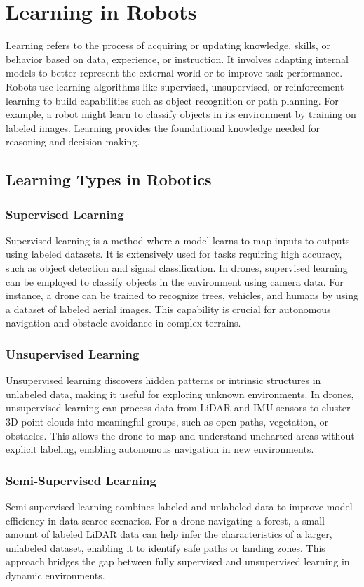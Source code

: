 \chapter{Learning in Robots}
Learning refers to the process of acquiring or updating knowledge, skills, or behavior based on data, experience, or instruction. It involves adapting internal models to better represent the external world or to improve task performance. Robots use learning algorithms like supervised, unsupervised, or reinforcement learning to build capabilities such as object recognition or path planning. For example, a robot might learn to classify objects in its environment by training on labeled images. Learning provides the foundational knowledge needed for reasoning and decision-making. 

\section{Learning Types in Robotics}

\subsection{Supervised Learning}
Supervised learning is a method where a model learns to map inputs to outputs using labeled datasets. It is extensively used for tasks requiring high accuracy, such as object detection and signal classification. In drones, supervised learning can be employed to classify objects in the environment using camera data. For instance, a drone can be trained to recognize trees, vehicles, and humans by using a dataset of labeled aerial images. This capability is crucial for autonomous navigation and obstacle avoidance in complex terrains. 

\subsection{Unsupervised Learning}
Unsupervised learning discovers hidden patterns or intrinsic structures in unlabeled data, making it useful for exploring unknown environments. In drones, unsupervised learning can process data from LiDAR and IMU sensors to cluster 3D point clouds into meaningful groups, such as open paths, vegetation, or obstacles. This allows the drone to map and understand uncharted areas without explicit labeling, enabling autonomous navigation in new environments. 

\subsection{Semi-Supervised Learning}
Semi-supervised learning combines labeled and unlabeled data to improve model efficiency in data-scarce scenarios. For a drone navigating a forest, a small amount of labeled LiDAR data can help infer the characteristics of a larger, unlabeled dataset, enabling it to identify safe paths or landing zones. This approach bridges the gap between fully supervised and unsupervised learning in dynamic environments. 

